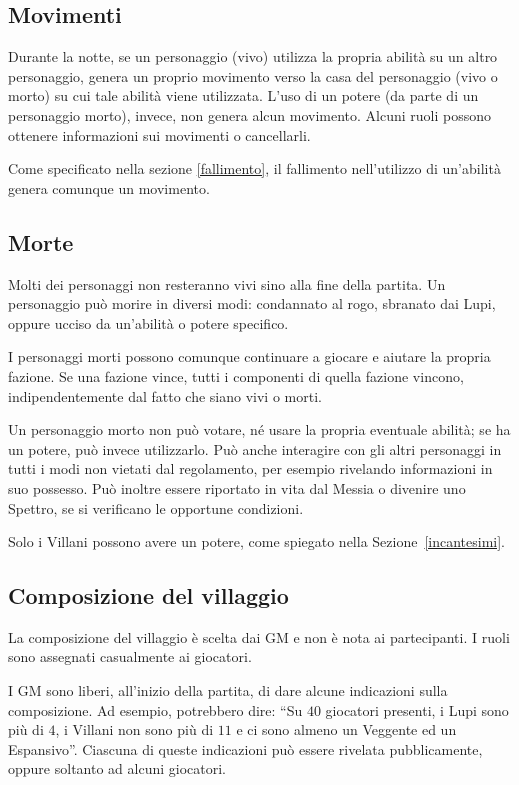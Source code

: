\documentclass[a4paper,10pt]{article}
\begin{document}

\subsection{Movimenti}

Durante la notte, se un personaggio (vivo) utilizza la propria abilità su un altro personaggio, genera un proprio movimento verso la casa del personaggio (vivo o morto) su cui tale abilità viene utilizzata. L'uso di un potere (da parte di un personaggio morto), invece, non genera alcun movimento. Alcuni ruoli possono ottenere informazioni sui movimenti o cancellarli.

Come specificato nella sezione \ref{fallimento}, il fallimento nell'utilizzo di un'abilità genera comunque un movimento.

\subsection{Morte}

Molti dei personaggi non resteranno vivi sino alla fine della partita. Un personaggio può morire in diversi modi: condannato al rogo, sbranato dai Lupi, oppure ucciso da un'abilità o potere specifico.

I personaggi morti possono comunque continuare a giocare e aiutare la propria fazione. Se una fazione vince, tutti i componenti di quella fazione vincono, indipendentemente dal fatto che siano vivi o morti.

Un personaggio morto non può votare, né usare la propria eventuale abilità; se ha un potere, può invece utilizzarlo. Può anche interagire con gli altri personaggi in tutti i modi non vietati dal regolamento, per esempio rivelando informazioni in suo possesso. Può inoltre essere riportato in vita dal Messia o divenire uno Spettro, se si verificano le opportune condizioni.

Solo i Villani possono avere un potere, come spiegato nella Sezione~\ref{incantesimi}.

\subsection{Composizione del villaggio}

La composizione del villaggio è scelta dai GM e non è nota ai partecipanti. I ruoli sono assegnati casualmente ai giocatori.

I GM sono liberi, all'inizio della partita, di dare alcune indicazioni sulla composizione. Ad esempio, potrebbero dire: ``Su $40$ giocatori presenti, i Lupi sono più di $4$, i Villani non sono più di $11$ e ci sono almeno un Veggente ed un Espansivo''. Ciascuna di queste indicazioni può essere rivelata pubblicamente, oppure soltanto ad alcuni giocatori.
\end{document}
